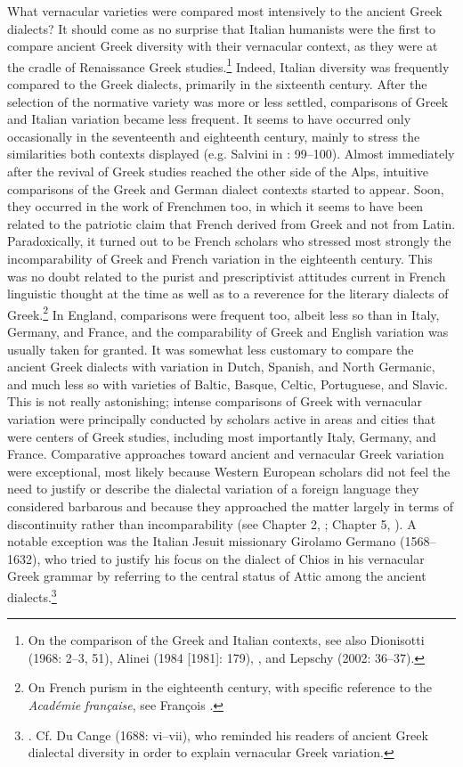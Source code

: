 What vernacular varieties were compared most intensively to the ancient Greek dialects? It should come as no surprise that Italian humanists were the first to compare ancient Greek diversity with their vernacular context, as they were at the cradle of Renaissance Greek studies.\footnote{On the comparison of the Greek and Italian contexts, see also Dionisotti (1968: 2–3, 51), Alinei (1984 [1981]: 179), \citet[215]{Trovato1984}, and Lepschy (2002: 36–37).} Indeed, Italian diversity was frequently compared to the Greek dialects, primarily in the sixteenth century. After the selection of the normative variety was more or less settled, comparisons of Greek and Italian variation became less frequent. It seems to have occurred only occasionally in the seventeenth and eighteenth century, mainly to stress the similarities both contexts displayed (e.g. Salvini in \citealt{MuratoriSalvini1724}: 99–100). Almost immediately after the revival of Greek studies reached the other side of the Alps, intuitive comparisons of the Greek and German dialect contexts started to appear. Soon, they occurred in the work of Frenchmen too, in which it seems to have been related to the patriotic claim that French derived from Greek and not from Latin. Paradoxically, it turned out to be French scholars who stressed most strongly the incomparability of Greek and French variation in the eighteenth century. This was no doubt related to the purist and prescriptivist attitudes current in French linguistic thought at the time as well as to a reverence for the literary dialects of Greek.\footnote{On French purism in the eighteenth century, with specific reference to the \textit{Académie} \textit{française}, see François .} In England, comparisons were frequent too, albeit less so than in Italy, Germany, and France, and the comparability of Greek and English variation was usually taken for granted. It was somewhat less customary to compare the ancient Greek dialects with variation in Dutch, Spanish, and North Germanic, and much less so with varieties of Baltic, Basque, Celtic, Portuguese, and Slavic. This is not really astonishing; intense comparisons of Greek with vernacular variation were principally conducted by scholars active in areas and cities that were centers of Greek studies, including most importantly Italy, Germany, and France. Comparative approaches toward ancient and vernacular Greek variation were exceptional, most likely because Western European scholars did not feel the need to justify or describe the dialectal variation of a foreign language they considered barbarous and because they approached the matter largely in terms of discontinuity rather than incomparability (see Chapter 2, ; Chapter 5, ). A notable exception was the Italian Jesuit missionary Girolamo Germano (1568–1632), who tried to justify his focus on the dialect of Chios in his vernacular Greek grammar by referring to the central status of Attic among the ancient dialects.\footnote{\citet[10]{Germano1622}. Cf. Du Cange (1688: vi–vii), who reminded his readers of ancient Greek dialectal diversity in order to explain vernacular Greek variation.}

